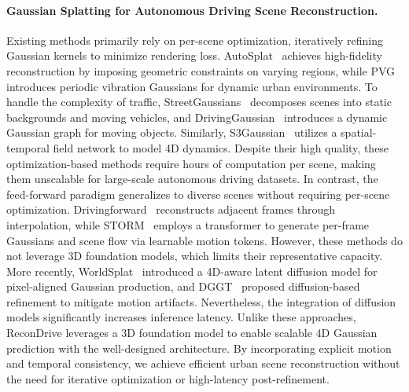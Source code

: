 \paragraph{Gaussian Splatting for Autonomous Driving Scene Reconstruction.}
Existing methods primarily rely on per-scene optimization, iteratively refining Gaussian kernels to minimize rendering loss. AutoSplat~\cite{khan2025autosplat} achieves high-fidelity reconstruction by imposing geometric constraints on varying regions, while PVG~\cite{chen2023periodic} introduces periodic vibration Gaussians for dynamic urban environments. To handle the complexity of traffic, StreetGaussians~\cite{yan2024street} decomposes scenes into static backgrounds and moving vehicles, and DrivingGaussian~\cite{zhou2024drivinggaussian} introduces a dynamic Gaussian graph for moving objects. Similarly, S3Gaussian~\cite{huang2024textit} utilizes a spatial-temporal field network to model 4D dynamics. Despite their high quality, these optimization-based methods require hours of computation per scene, making them unscalable for large-scale autonomous driving datasets.
In contrast, the feed-forward paradigm generalizes to diverse scenes without requiring per-scene optimization. Drivingforward~\cite{tian2025drivingforward} reconstructs adjacent frames through interpolation, while STORM~\cite{yang2024storm} employs a transformer to generate per-frame Gaussians and scene flow via learnable motion tokens. However, these methods do not leverage 3D foundation models, which limits their representative capacity. More recently, WorldSplat~\cite{zhu2025worldsplat} introduced a 4D-aware latent diffusion model for pixel-aligned Gaussian production, and DGGT~\cite{chen2025dggt} proposed diffusion-based refinement to mitigate motion artifacts. Nevertheless, the integration of diffusion models significantly increases inference latency.
Unlike these approaches, ReconDrive leverages a 3D foundation model to enable scalable 4D Gaussian prediction with the well-designed architecture. By incorporating explicit motion and temporal consistency, we achieve efficient urban scene reconstruction without the need for iterative optimization or high-latency post-refinement.